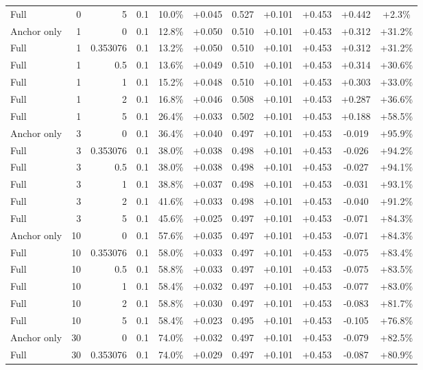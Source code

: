 \begin{table}[htbp]
\begin{tabular}{lrrrccccccc}
Full & 0 & 5 & 0.1 & 10.0\% & +0.045 & 0.527 & +0.101 & +0.453 & +0.442 & +2.3\% \\
Anchor only & 1 & 0 & 0.1 & 12.8\% & +0.050 & 0.510 & +0.101 & +0.453 & +0.312 & +31.2\% \\
Full & 1 & 0.353076 & 0.1 & 13.2\% & +0.050 & 0.510 & +0.101 & +0.453 & +0.312 & +31.2\% \\
Full & 1 & 0.5 & 0.1 & 13.6\% & +0.049 & 0.510 & +0.101 & +0.453 & +0.314 & +30.6\% \\
Full & 1 & 1 & 0.1 & 15.2\% & +0.048 & 0.510 & +0.101 & +0.453 & +0.303 & +33.0\% \\
Full & 1 & 2 & 0.1 & 16.8\% & +0.046 & 0.508 & +0.101 & +0.453 & +0.287 & +36.6\% \\
Full & 1 & 5 & 0.1 & 26.4\% & +0.033 & 0.502 & +0.101 & +0.453 & +0.188 & +58.5\% \\
Anchor only & 3 & 0 & 0.1 & 36.4\% & +0.040 & 0.497 & +0.101 & +0.453 & -0.019 & +95.9\% \\
Full & 3 & 0.353076 & 0.1 & 38.0\% & +0.038 & 0.498 & +0.101 & +0.453 & -0.026 & +94.2\% \\
Full & 3 & 0.5 & 0.1 & 38.0\% & +0.038 & 0.498 & +0.101 & +0.453 & -0.027 & +94.1\% \\
Full & 3 & 1 & 0.1 & 38.8\% & +0.037 & 0.498 & +0.101 & +0.453 & -0.031 & +93.1\% \\
Full & 3 & 2 & 0.1 & 41.6\% & +0.033 & 0.498 & +0.101 & +0.453 & -0.040 & +91.2\% \\
Full & 3 & 5 & 0.1 & 45.6\% & +0.025 & 0.497 & +0.101 & +0.453 & -0.071 & +84.3\% \\
Anchor only & 10 & 0 & 0.1 & 57.6\% & +0.035 & 0.497 & +0.101 & +0.453 & -0.071 & +84.3\% \\
Full & 10 & 0.353076 & 0.1 & 58.0\% & +0.033 & 0.497 & +0.101 & +0.453 & -0.075 & +83.4\% \\
Full & 10 & 0.5 & 0.1 & 58.8\% & +0.033 & 0.497 & +0.101 & +0.453 & -0.075 & +83.5\% \\
Full & 10 & 1 & 0.1 & 58.4\% & +0.032 & 0.497 & +0.101 & +0.453 & -0.077 & +83.0\% \\
Full & 10 & 2 & 0.1 & 58.8\% & +0.030 & 0.497 & +0.101 & +0.453 & -0.083 & +81.7\% \\
Full & 10 & 5 & 0.1 & 58.4\% & +0.023 & 0.495 & +0.101 & +0.453 & -0.105 & +76.8\% \\
Anchor only & 30 & 0 & 0.1 & 74.0\% & +0.032 & 0.497 & +0.101 & +0.453 & -0.079 & +82.5\% \\
Full & 30 & 0.353076 & 0.1 & 74.0\% & +0.029 & 0.497 & +0.101 & +0.453 & -0.087 & +80.9\% \\

\end{tabular}
\end{table}

